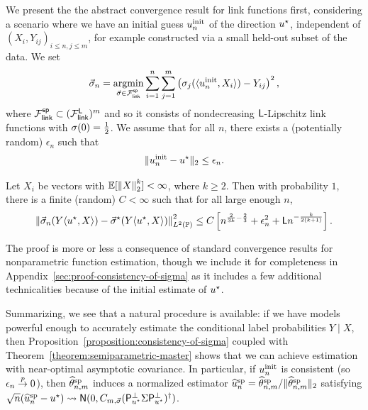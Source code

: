 We present the the abstract convergence result for link functions first,
considering a scenario where we have an initial guess $u_n^{\textup{init}}$ of the
direction $u^\star$, independent of $(X_i, Y_{ij})_{i \le n,j\le m}$, for
example constructed via a small held-out subset of the data. We set
\begin{equation*}
	\vec{\sigma}_n = \operatorname*{argmin}_{\vec{\sigma} \in \mathcal{F}_{\mathsf{link}}^{\mathsf{sp}}}
	\sum_{i = 1}^n\sum_{j = 1}^m
	\left(\sigma_j(\langle u_n^{\textup{init}}, X_i\rangle) - Y_{ij}\right)^2,
\end{equation*}
where $\mathcal{F}_{\mathsf{link}}^{\mathsf{sp}} \subset (\mathcal{F}_{\mathsf{link}}^{\mathsf{L}})^m$ and so it consists of
nondecreasing $\mathsf{L}$-Lipschitz link functions with $\sigma(0) = \frac{1}{2}$.
We assume that for all $n$, there exists a (potentially random) $\epsilon_n$
such that
\begin{equation*}
	\|{u_n^{\textup{init}} - u^\star}\|_2 \le \epsilon_n.
\end{equation*}
\begin{proposition}
	\label{proposition:consistency-of-sigma}
	Let $X_i$ be vectors with $\mathbb{E}[\left\|{X}\right\|_2^k] < \infty$, where
	$k \ge 2$. Then with probability $1$,
	there is a finite (random)
	$C < \infty$ such that for all large enough $n$,
	\begin{equation*}
		\left\|{\vec{\sigma}_n(Y\langle u^\star, X\rangle)
			- \vec{\sigma}^\star(Y\langle u^\star, X\rangle)}\right\|_{L^2(\mathbb{P})}^2
		\le C \left[
		n^{\frac{2}{3k} - \frac{2}{3}}
		+ \epsilon_n^2
		+ \mathsf{L} n^{-\frac{k}{2(k + 1)}}
		\right].
	\end{equation*}
\end{proposition}
\noindent
The proof is more or less a consequence of standard convergence results
for nonparametric function estimation, though we include
it for completeness in Appendix~\ref{sec:proof-consistency-of-sigma}
as it includes a few additional technicalities because
of the initial estimate of $u^\star$.

Summarizing, we see that a natural procedure is available: if we have models
powerful enough to accurately estimate the conditional label probabilities
$Y \mid X$, then Proposition~\ref{proposition:consistency-of-sigma} coupled
with Theorem~\ref{theorem:semiparametric-master} shows that we can achieve
estimation with near-optimal asymptotic covariance. In particular, if
$u_n^{\textup{init}}$ is consistent (so $\epsilon_n \stackrel{p}{\rightarrow} 0$), then $\widehat{\theta}^{\textup{sp}}_{n,m}$ induces a
normalized estimator $\widehat{u}^{\textup{sp}}_n = \widehat{\theta}^{\textup{sp}}_{n,m} / \|{\widehat{\theta}^{\textup{sp}}_{n,m}}\|_2$ satisfying
$\sqrt{n}(\widehat{u}^{\textup{sp}}_n - u^\star) \rightsquigarrow \mathsf{N}(0, C_{m,\vec{\sigma}}
({\mathsf{P}_{u^\star}^\perp \Sigma \mathsf{P}_{u^\star}^\perp})^\dagger)$.



